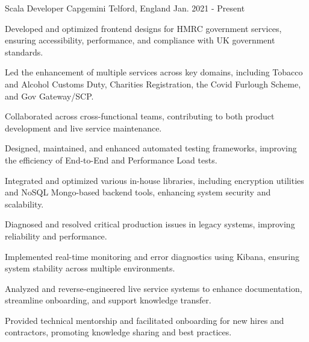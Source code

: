 
\begin{cventries}

  \cventry
    {Scala Developer} %
    {Capgemini} %
    {Telford, England} %
    {Jan. 2021 - Present} %
    {
      \raggedright
      \begin{cvitems}
        \item {Developed and optimized frontend designs for HMRC government services, ensuring accessibility, performance, and compliance with UK government standards.}
        \item {Led the enhancement of multiple services across key domains, including Tobacco and Alcohol Customs Duty, Charities Registration, the Covid Furlough Scheme, and Gov Gateway/SCP.}
        \item {Collaborated across cross-functional teams, contributing to both product development and live service maintenance.}
        \item {Designed, maintained, and enhanced automated testing frameworks, improving the efficiency of End-to-End and Performance Load tests.}
        \item {Integrated and optimized various in-house libraries, including encryption utilities and NoSQL Mongo-based backend tools, enhancing system security and scalability.}
        \item {Diagnosed and resolved critical production issues in legacy systems, improving reliability and performance.}
        \item {Implemented real-time monitoring and error diagnostics using Kibana, ensuring system stability across multiple environments.}
        \item {Analyzed and reverse-engineered live service systems to enhance documentation, streamline onboarding, and support knowledge transfer.}
        \item {Provided technical mentorship and facilitated onboarding for new hires and contractors, promoting knowledge sharing and best practices.}
      \end{cvitems}
}
\end{cventries}
